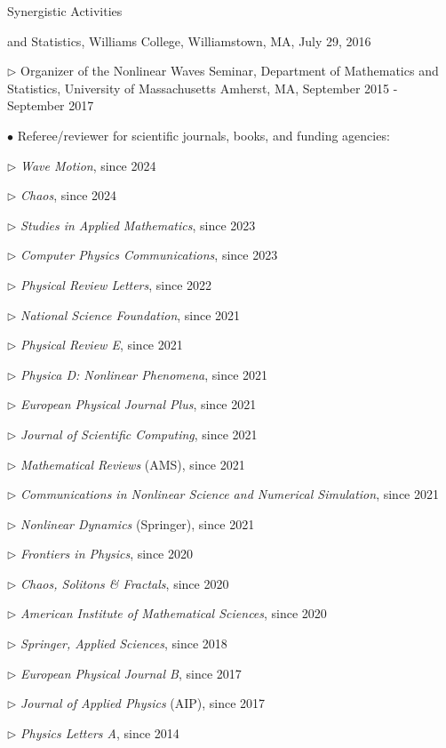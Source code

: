 \documentclass[10pt]{article} %
\newenvironment{outerlist}[1][\enskip\textbullet]%
        {\begin{itemize}[#1]}{\end{itemize}%
         \vspace{-.6\baselineskip}}
\newenvironment{innerlist}[1][\enskip\textbullet]%
        {\begin{compactitem}[#1]}{\end{compactitem}}
\begin{document}
\begin{section}{Synergistic Activities}
\begin{outerlist}
\begin{innerlist}
                        and Statistics, Williams College, Williamstown, MA, July 29, 2016      
\item[$\triangleright$] Organizer of the Nonlinear Waves Seminar, Department of Mathematics and Statistics,
University of Massachusetts Amherst, MA, September 2015 - September 2017
\end{innerlist} 
\item[$\bullet$] Referee/reviewer for scientific journals, books, and funding agencies:
\begin{innerlist}
\item[$\triangleright$] \textit{Wave Motion}, since 2024
\item[$\triangleright$] \textit{Chaos}, since 2024
\item[$\triangleright$] \textit{Studies in Applied Mathematics}, since 2023
\item[$\triangleright$] \textit{Computer Physics Communications}, since 2023
\item[$\triangleright$] \textit{Physical Review Letters}, since 2022
\item[$\triangleright$] \textit{National Science Foundation}, since 2021
\item[$\triangleright$] \textit{Physical Review E}, since 2021
\item[$\triangleright$] \textit{Physica D: Nonlinear Phenomena}, since 2021
\item[$\triangleright$] \textit{European Physical Journal Plus}, since 2021
\item[$\triangleright$] \textit{Journal of Scientific Computing}, since 2021
\item[$\triangleright$] \textit{Mathematical Reviews} (AMS), since 2021 
\item[$\triangleright$] \textit{Communications in Nonlinear Science and Numerical Simulation}, since 2021
\item[$\triangleright$] \textit{Nonlinear Dynamics} (Springer), since 2021 
\item[$\triangleright$] \textit{Frontiers in Physics}, since 2020
\item[$\triangleright$] \textit{Chaos, Solitons \& Fractals}, since 2020
\item[$\triangleright$] \textit{American Institute of Mathematical Sciences}, since 2020
\item[$\triangleright$] \textit{Springer, Applied Sciences}, since 2018
\item[$\triangleright$] \textit{European Physical Journal B}, since 2017
\item[$\triangleright$] \textit{Journal of Applied Physics} (AIP), since 2017
\item[$\triangleright$] \textit{Physics Letters A}, since 2014
\end{innerlist}

\end{outerlist}

\end{section}
\end{document}
